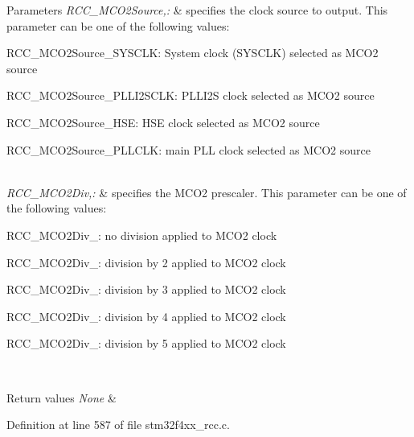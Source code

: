 \begin{DoxyParams}{Parameters}
{\em R\-C\-C\-\_\-\-M\-C\-O2\-Source,\-:} & specifies the clock source to output. This parameter can be one of the following values\-: \begin{DoxyItemize}
\item R\-C\-C\-\_\-\-M\-C\-O2\-Source\-\_\-\-S\-Y\-S\-C\-L\-K\-: System clock (S\-Y\-S\-C\-L\-K) selected as M\-C\-O2 source \item R\-C\-C\-\_\-\-M\-C\-O2\-Source\-\_\-\-P\-L\-L\-I2\-S\-C\-L\-K\-: P\-L\-L\-I2\-S clock selected as M\-C\-O2 source \item R\-C\-C\-\_\-\-M\-C\-O2\-Source\-\_\-\-H\-S\-E\-: H\-S\-E clock selected as M\-C\-O2 source \item R\-C\-C\-\_\-\-M\-C\-O2\-Source\-\_\-\-P\-L\-L\-C\-L\-K\-: main P\-L\-L clock selected as M\-C\-O2 source \end{DoxyItemize}
\\
\hline
{\em R\-C\-C\-\_\-\-M\-C\-O2\-Div,\-:} & specifies the M\-C\-O2 prescaler. This parameter can be one of the following values\-: \begin{DoxyItemize}
\item R\-C\-C\-\_\-\-M\-C\-O2\-Div\-\_\-: no division applied to M\-C\-O2 clock \item R\-C\-C\-\_\-\-M\-C\-O2\-Div\-\_\-: division by 2 applied to M\-C\-O2 clock \item R\-C\-C\-\_\-\-M\-C\-O2\-Div\-\_\-: division by 3 applied to M\-C\-O2 clock \item R\-C\-C\-\_\-\-M\-C\-O2\-Div\-\_\-: division by 4 applied to M\-C\-O2 clock \item R\-C\-C\-\_\-\-M\-C\-O2\-Div\-\_\-: division by 5 applied to M\-C\-O2 clock \end{DoxyItemize}
\\
\hline
\end{DoxyParams}

\begin{DoxyRetVals}{Return values}
{\em None} & \\
\hline
\end{DoxyRetVals}


Definition at line 587 of file stm32f4xx\-\_\-rcc.\-c.

